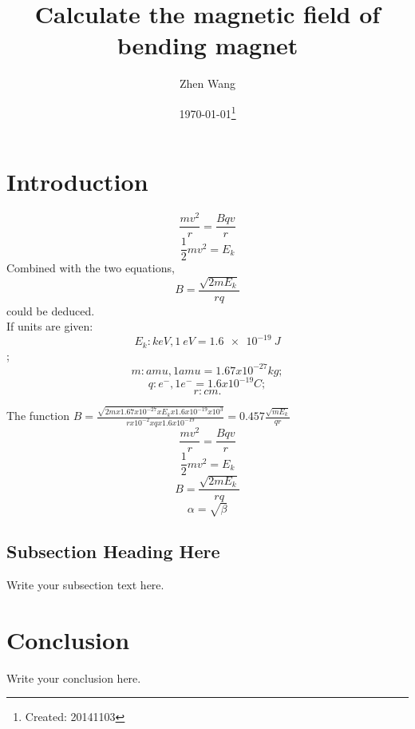 \documentclass[letterpaper,11pt,pdftex]{article}
\title{Calculate the magnetic field of bending magnet }
\author{Zhen Wang}
\date{\today\footnote{Created: 20141103}}
\begin{document}
\maketitle

\section{Introduction}
\begin{equation}
    \label{simple_equation}
    \frac{m{v}^{2}}{r} = \frac{Bqv}{r}
\end{equation}
\begin{equation}
    \label{simple_equation}
    \frac{1}{2}m{v}^{2} = {E}_{k}
\end{equation}
Combined with the two equations, 
\begin{equation}
    \label{simple_equation}
    B = \frac{\sqrt{2m{E}_{k}}}{rq}
\end{equation}
could be deduced.\\ 
If units are given:
$${E}_{k} : \si{keV},       \SI{1}{eV} = \SI{1.6e-19}{J}$$;
$$m : \si{amu},  1 amu = 1.67 x 10^{-27} kg;$$ 
$$q : {e}^{-}, 1 e^{-} = 1.6x 10^{-19} C;$$
$$r : cm.  $$

The function $B = \frac{\sqrt{2m x 1.67 x 10^{-27} x {E}_{k} x 1.6x 10^{-19} x 10^{3} }}{r x 10^{-2} x q x 1.6x 10^{-19} } = 0.457 \frac{\sqrt{m{E}_{k}}}{qr}$
$$\frac{m{v}^{2}}{r} = \frac{Bqv}{r}$$
$$\frac{1}{2}m{v}^{2} = {E}_{k}$$
$$B = \frac{\sqrt{2m{E}_{k}}}{rq}$$
\begin{equation}
    \label{simple_equation}
    \alpha = \sqrt{ \beta }
\end{equation}

\subsection{Subsection Heading Here}
Write your subsection text here.



\section{Conclusion}
Write your conclusion here.

\renewcommand{\bibname}{Bibliography}

% 
\end{document}
